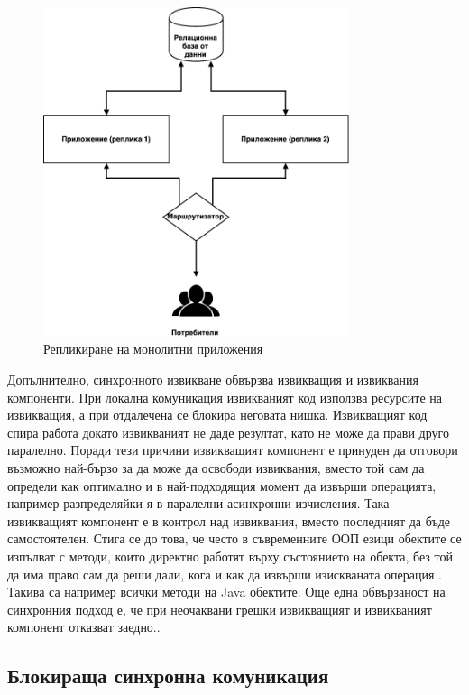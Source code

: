 \begin{figure}
  \centering\includegraphics[width=0.8\textwidth]{images/monolithic-application-replication.pdf}
  \caption{Репликиране на монолитни приложения}
  \label{fig:monolithic-replication}
\end{figure}

Допълнително, синхронното извикване обвързва извикващия и извиквания компоненти. При локална комуникация извикваният код използва ресурсите на извикващия, а при отдалечена се блокира неговата нишка. Извикващият код спира работа докато извикваният не даде резултат, като не може да прави друго паралелно. Поради тези причини извикващият компонент е принуден да отговори възможно най-бързо за да може да освободи извиквания, вместо той сам да определи как оптимално и в най-подходящия момент да извърши операцията, например разпределяйки я в паралелни асинхронни изчисления. Така извикващият компонент е в контрол над извиквания, вместо последният да бъде самостоятелен. Стига се до това, че често в съвременните ООП езици обектите се изпълват с методи, които директно работят върху състоянието на обекта, без той да има право сам да реши дали, кога и как да извърши изискваната операция \cite{kuhn2015ReactiveDesignPatterns}. Такива са например всички  методи на Java обектите. Още една обвързаност на синхронния подход е, че при неочаквани грешки извикващият и извикваният компонент отказват заедно..

\subsection{Блокираща синхронна комуникация}

